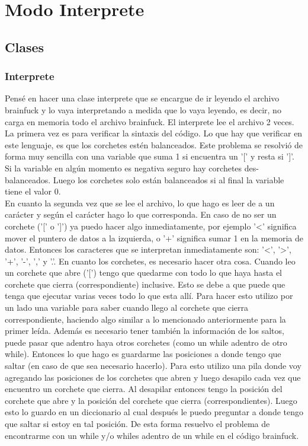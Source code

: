 \documentclass[titlepage,a4paper]{article}
\begin{document}
\lstset{language=C} 
\newpage

\section{Modo Interprete}

\subsection{Clases}

\subsubsection{Interprete}
Pensé en hacer una clase interprete que se encargue de ir leyendo el archivo brainfuck y lo vaya interpretando a medida que lo vaya leyendo, es decir, no carga en memoria todo el archivo brainfuck. El interprete lee el archivo 2 veces.\\

	La primera vez es para verificar la sintaxis del código. Lo que hay que verificar en este lenguaje, es que los corchetes estén balanceados. Este problema se resolvió de forma muy sencilla con una variable que suma 1 si encuentra un '[' y resta si ']'. Si la variable en algún momento es negativa seguro hay corchetes des-balanceados. Luego los corchetes solo están balanceados si al final la variable tiene el valor 0.\\

	En cuanto la segunda vez que se lee el archivo, lo que hago es leer de a un carácter y según el carácter hago lo que corresponda. En caso de no ser un corchete ('[' o ']') ya puedo hacer algo inmediatamente, por ejemplo '<' significa mover el puntero de datos a la izquierda, o '+' significa sumar 1 en la memoria de datos. Entonces los caracteres que se interpretan inmediatamente son: '<', '>', '+', '-', ',' y '.'. En cuanto los corchetes, es necesario hacer otra cosa. Cuando leo un corchete que abre ('[') tengo que quedarme con todo lo que haya hasta el corchete que cierra (correspondiente) inclusive. Esto se debe a que puede que tenga que ejecutar varias veces todo lo que esta allí. Para hacer esto utilizo por un lado una variable para saber cuando llego al corchete que cierra correspondiente, haciendo algo similar a lo mencionado anteriormente para la primer leída. Además es necesario tener también la información de los saltos, puede pasar que adentro haya otros corchetes (como un while adentro de otro while). Entonces lo que hago es guardarme las posiciones a donde tengo que saltar (en caso de que sea necesario hacerlo). Para esto utilizo una pila donde voy agregando las posiciones de los corchetes que abren y luego desapilo cada vez que encuentro un corchete que cierra. Al desapilar entonces tengo la posición del corchete que abre y la posición del corchete que cierra (correspondientes). Luego esto lo guardo en un diccionario al cual después le puedo preguntar a donde tengo que saltar si estoy en tal posición. De esta forma resuelvo el problema de encontrarme con un while y/o whiles adentro de un while en el código brainfuck.
	
\end{document}

